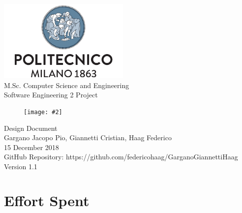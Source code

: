 \documentclass{report}
\newcommand{\image}[4]{
	\begin{figure}[H]
	\centering
	\texttt{[image: \#2]}
	\caption*{#3}
	\label{#4}

	\label{fig:nonfloat} %
	\end{figure}
}
\begin{document}
	\begin{titlepage}
		\centering	
		\vfill
		{
			\includegraphics[width =\linewidth, height = 4cm, keepaspectratio]{PolitecnicoLogo.png}
			\label{fig:PolitecnicoLogo}
			\large \\[2ex]M.Sc. Computer Science and Engineering\\
			\large Software Engineering 2 Project\\[9ex]			
			\image{5cm}{TrackMeLogo.png}{}{TrackMeLogo}
			\huge Design Document\\[4ex]

			\normalsize Gargano Jacopo Pio, Giannetti Cristian, Haag Federico\\[1.5ex]
			\normalsize 15 December 2018 \\[1.5ex]
			\normalsize GitHub Repository: https://github.com/federicohaag/GarganoGiannettiHaag\\[3ex]
			\normalsize Version 1.1
		}
		
	\end{titlepage}

	\newpage
	\tableofcontents
	\thispagestyle{fancy}
	
	\newpage
	
	
	
	
	
	
		
	\chapter{Effort Spent}
	\thispagestyle{fancy}
\end{document}
